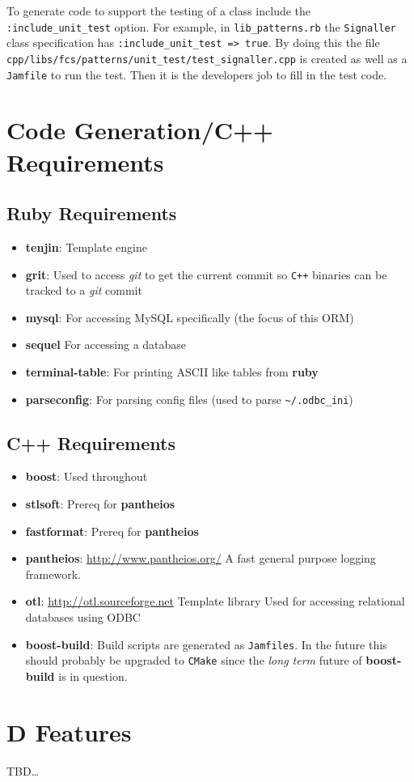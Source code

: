 \documentclass[11pt]{article}
\begin{document}
   To generate code to support the testing of a class include the
   \texttt{:include\_unit\_test} option. For example, in \texttt{lib\_patterns.rb} the
   \texttt{Signaller} class specification has \texttt{:include\_unit\_test =>    true}. By doing this the file
   \texttt{cpp/libs/fcs/patterns/unit\_test/test\_signaller.cpp} is created as
   well as a \texttt{Jamfile} to run the test. Then it is the developers job
   to fill in the test code.

\section{Code Generation/C++ Requirements}
\label{sec-7}


\subsection{Ruby Requirements}
\label{sec-7.1}

\begin{itemize}
\item \textbf{tenjin}: Template engine
\item \textbf{grit}: Used to access \emph{git} to get the current commit so \texttt{C++}
    binaries can be tracked to a \emph{git} commit
\item \textbf{mysql}: For accessing MySQL specifically (the focus of this ORM)
\item \textbf{sequel} For accessing a database
\item \textbf{terminal-table}: For printing ASCII like tables from \textbf{ruby}
\item \textbf{parseconfig}: For parsing config files (used to parse \texttt{\textasciitilde{}/.odbc\_ini})
\end{itemize}
  
\subsection{C++ Requirements}
\label{sec-7.2}


\begin{itemize}
\item \textbf{boost}: Used throughout
\item \textbf{stlsoft}: Prereq for \textbf{pantheios}
\item \textbf{fastformat}: Prereq for \textbf{pantheios}
\item \textbf{pantheios}: \href{http://www.pantheios.org/}{http://www.pantheios.org/} A fast general purpose
    logging framework.
\item \textbf{otl}: \href{http://otl.sourceforge.net}{http://otl.sourceforge.net} Template library Used for
    accessing relational databases using ODBC
\item \textbf{boost-build}: Build scripts are generated as \texttt{Jamfiles}. In the
    future this should probably be upgraded to \texttt{CMake} since the \emph{long     term} future of \textbf{boost-build} is in question.
\end{itemize}
\section{D Features}
\label{sec-8}

  TBD\ldots{}
\end{document}
